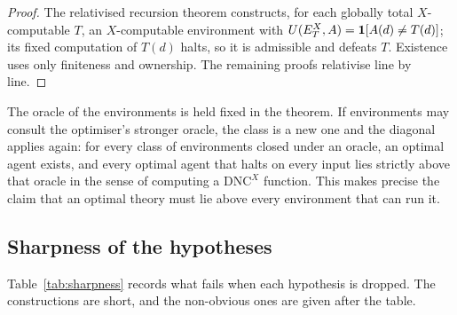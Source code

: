 \begin{proof}
The relativised recursion theorem \autocite[Thm.~II.2.13 and p.~177]{odifreddi1989} constructs, for each globally total
$X$-computable $T$, an $X$-computable environment with $U(E^X_T,A)=\mathbf{1}[A(d)\ne T(d)]$; its fixed
computation of $T(d)$ halts, so it is admissible and defeats $T$. Existence uses only finiteness and
ownership. The remaining proofs relativise line by line.
\end{proof}

The oracle of the environments is held fixed in the theorem. If environments may consult the
optimiser's stronger oracle, the class is a new one and the diagonal applies again: for every class of
environments closed under an oracle, an optimal agent exists, and every optimal agent that halts on
every input lies strictly above that oracle in the sense of computing a $\mathrm{DNC}^X$ function. This
makes precise the claim that an optimal theory must lie above every environment that can run it.

\subsection{Sharpness of the hypotheses}

Table~\ref{tab:sharpness} records what fails when each hypothesis is dropped. The constructions are
short, and the non-obvious ones are given after the table.

